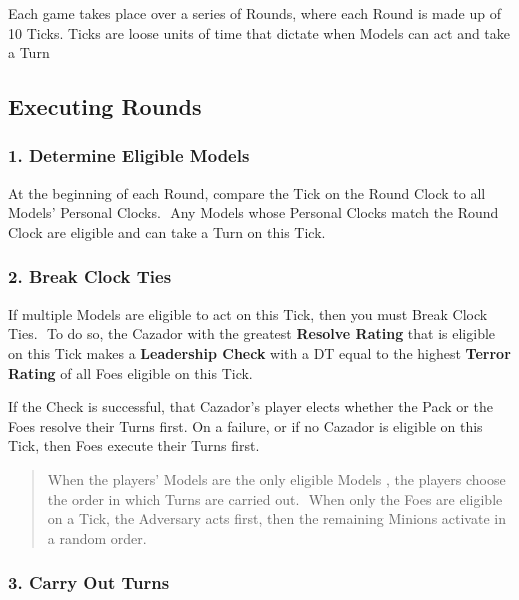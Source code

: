 \documentclass[
]{book}
\begin{document}
Each game takes place over a series of Rounds, where each Round is made up of 10 Ticks. Ticks are loose units of time that dictate when Models can act and take a Turn

\hypertarget{rounds}{%
\subsection*{Executing Rounds}\label{rounds}}

\hypertarget{determine-eligible-models}{%
\subsubsection*{1. Determine Eligible Models}\label{determine-eligible-models}}

At the beginning of each Round, compare the Tick on the Round Clock to all Models' Personal Clocks.  Any Models whose Personal Clocks match the Round Clock are eligible and can take a Turn on this Tick.

\hypertarget{break-clock-ties}{%
\subsubsection*{2. Break Clock Ties}\label{break-clock-ties}}

If multiple Models are eligible to act on this Tick, then you must Break Clock Ties.  To do so, the Cazador with the greatest \textbf{Resolve Rating} that is eligible on this Tick makes a \textbf{Leadership Check} with a DT equal to the highest \textbf{Terror Rating} of all Foes eligible on this Tick.  

If the Check is successful, that Cazador's player elects whether the Pack or the Foes resolve their Turns first. On a failure, or if no Cazador is eligible on this Tick, then Foes execute their Turns first.  

\begin{quote}
When the players' Models are the only eligible Models , the players choose the order in which Turns are carried out.  When only the Foes are eligible on a Tick, the Adversary acts first, then the remaining Minions activate in a random order.
\end{quote}

\hypertarget{carry-out-turns}{%
\subsubsection*{3. Carry Out Turns}\label{carry-out-turns}}
\end{document}
